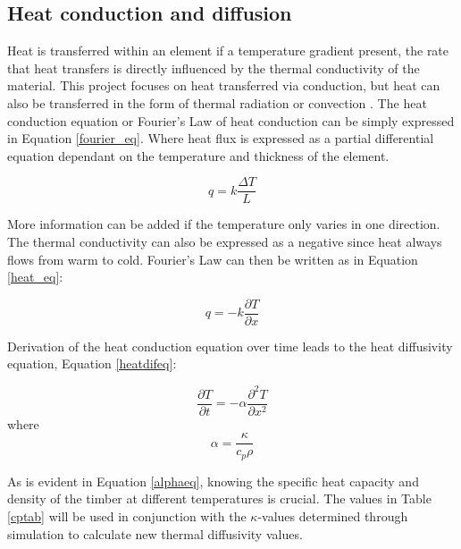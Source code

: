 \subsection{Heat conduction and diffusion}\label{heatconsec}	 
	Heat is transferred within an element if a temperature gradient present, the rate that heat transfers is directly influenced by the thermal conductivity of the material. 
	This project focuses on heat transferred via conduction, but heat can also be transferred in the form of thermal radiation or convection \cite{Fish:2007}.
	The heat conduction equation or Fourier's Law of heat conduction \citep{Fourier:1878} can be simply expressed in  Equation \ref{fourier_eq}.
	Where heat flux is expressed as a partial differential equation dependant on the temperature and thickness of the element. 

	\begin{equation}
	\label{fourier_eq}
		q = k \frac{\Delta T}{L}
	\end{equation}

	More information can be added if the temperature only varies in one direction. 
	The thermal conductivity can also be expressed as a negative since heat always flows from warm to cold.
	Fourier's Law can then be written as in Equation \ref{heat_eq}:
	
	\begin{equation}
	\label{heat_eq}
		q = -k \frac{\partial{T}}{\partial{x}}
	\end{equation}

Derivation of the heat conduction equation over time leads to the heat diffusivity equation, Equation \ref{heatdifeq}:

\begin{equation}\label{heatdifeq}
\frac{\partial T}{\partial t} = -\alpha \frac{\partial^2 T}{\partial x^2}
\end{equation}
where 
\begin{equation}\label{alphaeq}
\alpha = \frac{\kappa}{c_p\rho}
\end{equation}

As is evident in Equation \ref{alphaeq}, knowing the specific heat capacity and density of the timber at different temperatures is crucial.
The values in Table \ref{cptab} will be used in conjunction with the $\kappa$-values determined through simulation to calculate new thermal diffusivity values.

